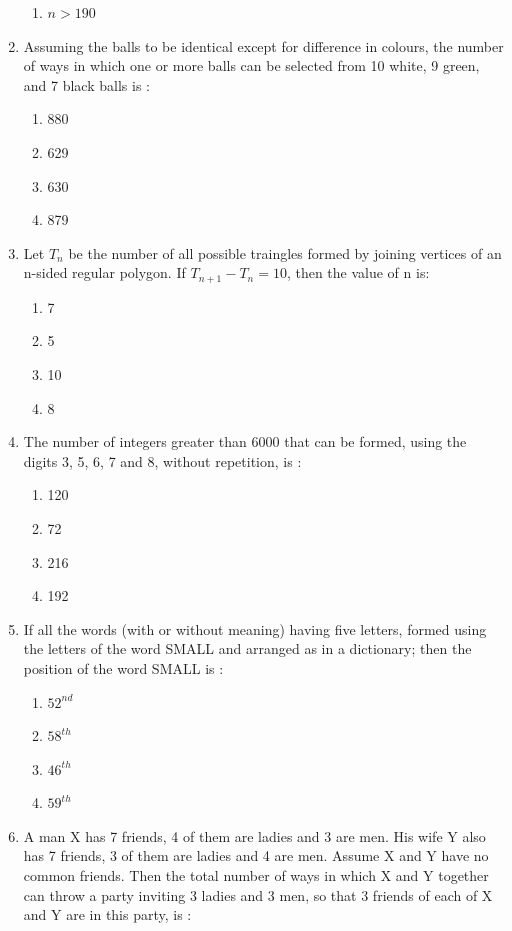 \begin{enumerate}[label=\arabic*.,ref=\thesubsection.\theenumi]
\begin{enumerate}
\item $n > 190$\\
\end{enumerate}  
\item Assuming the balls to be identical except for difference in colours, the number of ways in which one  or more balls can be selected from 10 white, 9 green, and 7 black balls is :
\begin{enumerate}
\item 880
\item 629
\item 630
\item 879\\
\end{enumerate}
\item Let $T_n$ be the number of all possible traingles formed by joining vertices of an n-sided regular polygon. If $T_{n+1}-T_n = 10$, then the value of n is:
\begin{enumerate}
\item 7
\item 5
\item 10
\item 8\\
\end{enumerate}
\item The number of integers greater than 6000 that can be formed, using the digits 3, 5, 6, 7 and 8, without repetition, is :
\begin{enumerate}
\item 120
\item 72
\item 216
\item 192\\
\end{enumerate}
\item If all the words (with or without meaning) having five letters, formed using the letters of the word SMALL and arranged as in a dictionary; then the position of the word SMALL is :
\begin{enumerate}
\item $52^{nd}$
\item $58^{th}$
\item $46^{th}$
\item $59^{th}$\\
\end{enumerate}
\item A man X has 7 friends, 4 of them are ladies and 3 are men. His wife Y also has 7 friends, 3 of them are ladies and 4 are men. Assume X and Y have no common friends. Then the total number of ways in which X and Y together can throw a party inviting 3 ladies and 3 men, so that 3 friends of each of X and Y are in this party, is :

\end{enumerate}
